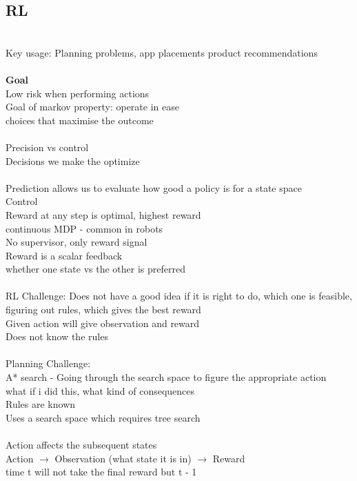 \documentclass[11pt]{article}
\begin{document}
\subsection*{RL}\\
Key usage: Planning problems, app placements product recommendations\\\\
\textbf{Goal}\\
Low risk when performing actions\\
Goal of markov property: operate in ease\\
choices that maximise the outcome\\
\\
Precision vs control\\
Decisions we make the optimize\\
\\
Prediction allows us to evaluate how good a policy is for a state space\\
Control\\
Reward at any step is optimal, highest reward
\\
continuous MDP - common in robots\\
No supervisor, only reward signal\\
Reward is a scalar feedback\\
whether one state vs the other is preferred\\
\\
RL Challenge: Does not have a good idea if it is right to do, which one is feasible, figuring out rules, which gives the best reward
\\
Given action will give observation and reward\\
Does not know the rules\\
\\
Planning Challenge:\\
A* search - Going through the search space to figure the appropriate action\\
what if i did this, what kind of consequences
\\
Rules are known\\
Uses a search space which requires tree search
\\
\\
Action affects the subsequent states\\
Action $\rightarrow$ Observation (what state it is in) $\rightarrow$  Reward\\
time t will not take the final reward but t - 1\\
\end{document}

